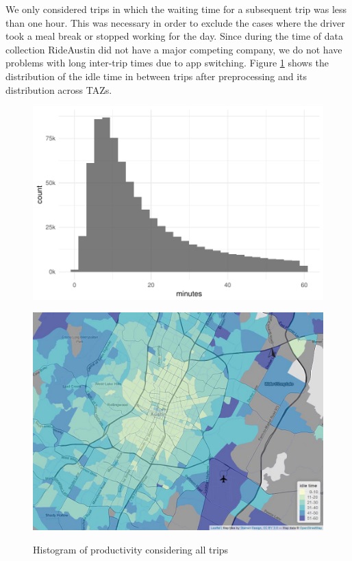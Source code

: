 \documentclass[11pt]{article}
\begin{document}
We only considered trips in which the waiting time for a subsequent trip was less than one hour. This was necessary in order to exclude the cases where the driver took a meal break or stopped working for the day. Since during the time of data collection RideAustin did not have a major competing company, we do not have problems with long inter-trip times due to app switching. Figure \ref{fig:idledist} shows the distribution of the idle time in between trips after preprocessing and its distribution across TAZs.


\begin{figure}[htb]
    \centering
    \begin{minipage}[t]{.8\linewidth}
        \centering
        \includegraphics[width=0.8\linewidth]{img/idletime_hist.pdf}
        \label{fig:idlehist}
    \end{minipage}\hfill
    \begin{minipage}[t]{.8\linewidth}
        \centering
        \includegraphics[width=0.8\linewidth]{img/idletime_spatial.jpeg}
        \label{fig:idlemap}
    \end{minipage}%
    \caption{Histogram of productivity considering all trips}
    \label{fig:idledist}
\end{figure}
\end{document}
